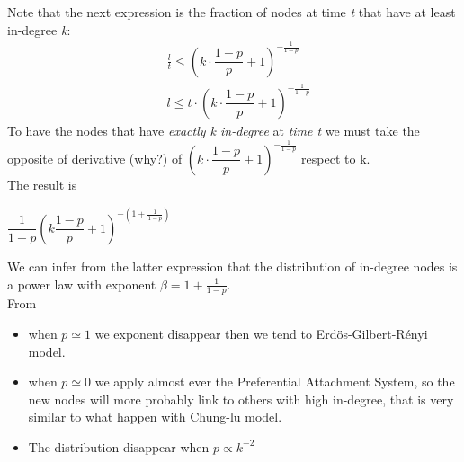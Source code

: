 Note that the next expression is the fraction of nodes at time \textit{t} that have at least in-degree \textit{k}:
\begin{align*}
	 & \frac{l}{t}\leq \left(k \cdot \dfrac{1-p}{p} + 1\right)^{-\frac{1}{1-p}} \\
	  & l \leq t \cdot \left(k\cdot \dfrac{1-p}{p} + 1\right)^{-\frac{1}{1-p}}
\end{align*}
To have the nodes that have \textit{exactly k in-degree} at \textit{time t} we must take the opposite of derivative (why?) of $  \left(k \cdot \dfrac{1-p}{p} + 1\right)^{-\frac{1}{1-p}} $ respect to k.\\ The result is 
\begin{center}
	$ \dfrac{1}{1-p} \left( k \dfrac{1-p}{p} + 1 \right)^{-\left(1 + \frac{1}{1-p}\right)} $
\end{center}
We can infer from the latter expression that the distribution of in-degree nodes is a power law with exponent $ \beta =  1 + \frac{1}{1-p}$.\\
From 
\begin{itemize}
	\item  when $ p \simeq 1 $ we exponent disappear then we tend to Erd\"{o}s-Gilbert-R\'{e}nyi model.
	\item when $ p \simeq 0 $ we apply almost ever the Preferential Attachment  System,  so the new nodes will more probably link to others with high in-degree, that is very similar to what happen with Chung-lu model.
	\item The distribution disappear when $ p \propto k^{-2} $ %
\end{itemize}